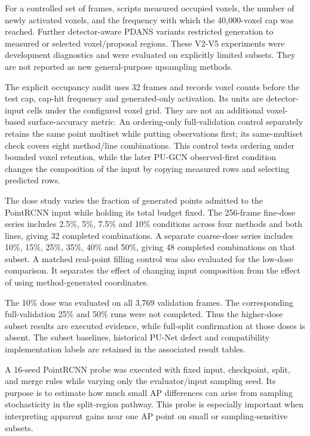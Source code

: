 \label{sec:fc-4-12-4}

For a controlled set of frames, scripts measured occupied voxels, the number of newly activated voxels, and the frequency with which the 40,000-voxel cap was reached. Further detector-aware PDANS variants restricted generation to measured or selected voxel/proposal regions. These V2-V5 experiments were development diagnostics and were evaluated on explicitly limited subsets. They are not reported as new general-purpose upsampling methods.

The explicit occupancy audit uses 32 frames and records voxel
counts before the test cap, cap-hit frequency and generated-only
activation. Its units are detector-input cells under the configured
voxel grid. They are not an additional voxel-based surface-accuracy
metric. An ordering-only full-validation control separately retains
the same point multiset while putting observations first; its
same-multiset check covers eight method/line combinations. This
control tests ordering under bounded voxel retention, while the
later PU-GCN observed-first condition changes the composition of
the input by copying measured rows and selecting predicted rows.

\label{sec:fc-4-12-5}

The dose study varies the fraction of generated points admitted
to the PointRCNN input while holding its total budget fixed.
The 256-frame fine-dose series includes 2.5\%, 5\%, 7.5\% and
10\% conditions across four methods and both lines, giving 32
completed combinations. A separate coarse-dose series includes
10\%, 15\%, 25\%, 35\%, 40\% and 50\%, giving 48 completed
combinations on that subset. A matched real-point filling control
was also evaluated for the low-dose comparison. It separates
the effect of changing input composition from the effect of using
method-generated coordinates.

The 10\% dose was evaluated on all 3,769 validation frames.
The corresponding full-validation 25\% and 50\% runs were not
completed. Thus the higher-dose subset results are executed
evidence, while full-split confirmation at those doses is absent.
The subset baselines, historical PU-Net defect and compatibility
implementation labels are retained in the associated result tables.

\label{sec:fc-4-12-6}

A 16-seed PointRCNN probe was executed with fixed input, checkpoint, split, and merge rules while varying only the evaluator/input sampling seed. Its purpose is to estimate how much small AP differences can arise from sampling stochasticity in the split-region pathway. This probe is especially important when interpreting apparent gains near one AP point on small or sampling-sensitive subsets.

